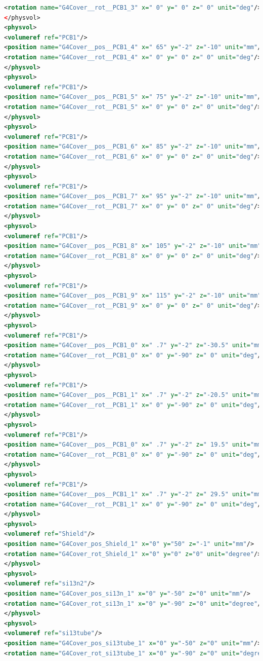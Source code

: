 \begin{lstlisting}[language=XML, firstline=1, lastline=89]
<rotation name="G4Cover__rot__PCB1_3" x=" 0" y=" 0" z=" 0" unit="deg"/>
</physvol>
<physvol>
<volumeref ref="PCB1"/>
<position name="G4Cover__pos__PCB1_4" x=" 65" y="-2" z="-10" unit="mm"/>
<rotation name="G4Cover__rot__PCB1_4" x=" 0" y=" 0" z=" 0" unit="deg"/>
</physvol>
<physvol>
<volumeref ref="PCB1"/>
<position name="G4Cover__pos__PCB1_5" x=" 75" y="-2" z="-10" unit="mm"/>
<rotation name="G4Cover__rot__PCB1_5" x=" 0" y=" 0" z=" 0" unit="deg"/>
</physvol>
<physvol>
<volumeref ref="PCB1"/>
<position name="G4Cover__pos__PCB1_6" x=" 85" y="-2" z="-10" unit="mm"/>
<rotation name="G4Cover__rot__PCB1_6" x=" 0" y=" 0" z=" 0" unit="deg"/>
</physvol>
<physvol>
<volumeref ref="PCB1"/>
<position name="G4Cover__pos__PCB1_7" x=" 95" y="-2" z="-10" unit="mm"/>
<rotation name="G4Cover__rot__PCB1_7" x=" 0" y=" 0" z=" 0" unit="deg"/>
</physvol>
<physvol>
<volumeref ref="PCB1"/>
<position name="G4Cover__pos__PCB1_8" x=" 105" y="-2" z="-10" unit="mm"/>
<rotation name="G4Cover__rot__PCB1_8" x=" 0" y=" 0" z=" 0" unit="deg"/>
</physvol>
<physvol>
<volumeref ref="PCB1"/>
<position name="G4Cover__pos__PCB1_9" x=" 115" y="-2" z="-10" unit="mm"/>
<rotation name="G4Cover__rot__PCB1_9" x=" 0" y=" 0" z=" 0" unit="deg"/>
</physvol>
<physvol>
<volumeref ref="PCB1"/>
<position name="G4Cover__pos__PCB1_0" x=" .7" y="-2" z="-30.5" unit="mm"/>
<rotation name="G4Cover__rot__PCB1_0" x=" 0" y="-90" z=" 0" unit="deg"/>
</physvol>
<physvol>
<volumeref ref="PCB1"/>
<position name="G4Cover__pos__PCB1_1" x=" .7" y="-2" z="-20.5" unit="mm"/>
<rotation name="G4Cover__rot__PCB1_1" x=" 0" y="-90" z=" 0" unit="deg"/>
</physvol>
<physvol>
<volumeref ref="PCB1"/>
<position name="G4Cover__pos__PCB1_0" x=" .7" y="-2" z=" 19.5" unit="mm"/>
<rotation name="G4Cover__rot__PCB1_0" x=" 0" y="-90" z=" 0" unit="deg"/>
</physvol>
<physvol>
<volumeref ref="PCB1"/>
<position name="G4Cover__pos__PCB1_1" x=" .7" y="-2" z=" 29.5" unit="mm"/>
<rotation name="G4Cover__rot__PCB1_1" x=" 0" y="-90" z=" 0" unit="deg"/>
</physvol>
<physvol>
<volumeref ref="Shield"/>
<position name="G4Cover_pos_Shield_1" x="0" y="50" z="-1" unit="mm"/>
<rotation name="G4Cover_rot_Shield_1" x="0" y="0" z="0" unit="degree"/>
</physvol>
<physvol>
<volumeref ref="si13n2"/>
<position name="G4Cover_pos_si13n_1" x="0" y="-50" z="0" unit="mm"/>
<rotation name="G4Cover_rot_si13n_1" x="0" y="-90" z="0" unit="degree"/>
</physvol>
<physvol>
<volumeref ref="si13tube"/>
<position name="G4Cover_pos_si13tube_1" x="0" y="-50" z="0" unit="mm"/>
<rotation name="G4Cover_rot_si13tube_1" x="0" y="-90" z="0" unit="degree"/>


\end{lstlisting}
